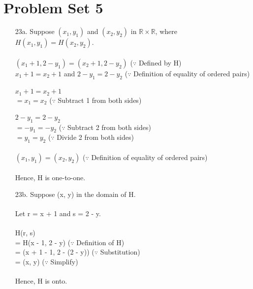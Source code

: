 \documentclass[12pt]{article}
\begin{document}
\section*{Problem Set 5}
\begin{itemize}
    \item [23a.]
        Suppose $(x_1, y_1)$ and $(x_2, y_2)$ in $\mathbb{R} \times \mathbb{R}$, where
        $H(x_1, y_1) = H(x_2, y_2)$.\\
        \\
        $(x_1 + 1, 2 - y_1) = (x_2 + 1, 2 - y_2)$ \hspace{3em} ($\because$ Defined by H) \\
        $x_1 + 1 = x_2 + 1$ and $2 - y_1 = 2 - y_2$ \hspace{2em} ($\because$ Definition of
            equality of ordered pairs) \\
        \\
        $x_1 + 1 = x_2 + 1$ \\
        $= x_1 = x_2$ \hspace{5em} ($\because$ Subtract 1 from both sides) \\
        \\
        $2 - y_1 = 2 - y_2$ \\
        $= - y_1 = - y_2$ \hspace{3em} ($\because$ Subtract 2 from both sides) \\
        $= y_1 = y_2$ \hspace{3em} ($\because$ Divide 2 from both sides) \\
        \\
        $(x_1, y_1) = (x_2, y_2)$ \hspace{5em} ($\because$ Definition of equality of
            ordered pairs) \\
        \\
        Hence, H is one-to-one.

    \item [23b.]
        Suppose (x, y) in the domain of H. \\
        \\
        Let r = x + 1 and s = 2 - y. \\
        \\
        H(r, s) \\
        = H(x - 1, 2 - y) \hspace{6em} ($\because$ Definition of H) \\
        = (x + 1 - 1, 2 - (2 - y)) \hspace{3em} ($\because$ Substitution) \\
        = (x, y) \hspace{6em} ($\because$ Simplify) \\
        \\
        Hence, H is onto.

\end{itemize}
\end{document}

